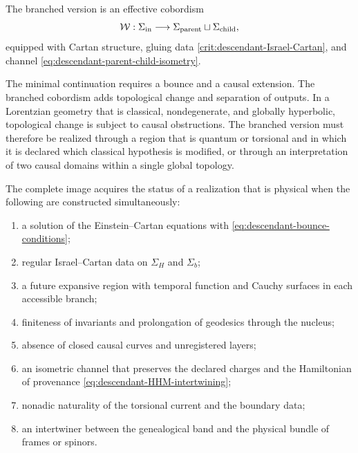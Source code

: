 \begin{definition}
\label{def:descendant-cobordism}
The branched version is an effective cobordism
\begin{equation}
 \mathcal W:\Sigma_{\rm in}\longrightarrow
 \Sigma_{\rm parent}\sqcup\Sigma_{\rm child},
 \label{eq:descendant-cobordism}
\end{equation}
equipped with Cartan structure, gluing data
\cref{crit:descendant-Israel-Cartan}, and channel
\cref{eq:descendant-parent-child-isometry}.
\end{definition}

The minimal continuation requires a bounce and a causal extension. The
branched cobordism adds topological change and separation of outputs.
In a Lorentzian geometry that is classical, nondegenerate, and globally
hyperbolic, topological change is subject to causal obstructions.
The branched version must therefore be realized through a region that is
quantum or torsional and in which it is declared which classical hypothesis is modified,
or through an interpretation of two causal domains within a single
global topology.

\begin{criterion}
\label{crit:descendant-promotion}
The complete image acquires the status of a realization that is physical when the following are
constructed simultaneously:
\begin{enumerate}[label=\roman*)]
 \item a solution of the Einstein--Cartan equations with
       \cref{eq:descendant-bounce-conditions};
 \item regular Israel--Cartan data on \(\Sigma_H\) and \(\Sigma_b\);
 \item a future expansive region with temporal function and Cauchy surfaces in
       each accessible branch;
 \item finiteness of invariants and prolongation of geodesics through the
       nucleus;
 \item absence of closed causal curves and unregistered layers;
 \item an isometric channel that preserves the declared charges and the
       Hamiltonian of provenance \cref{eq:descendant-HHM-intertwining};
 \item nonadic naturality of the torsional current and the
       boundary data;
 \item an intertwiner between the genealogical band and the physical bundle of
       frames or spinors.
\end{enumerate}
\end{criterion}

